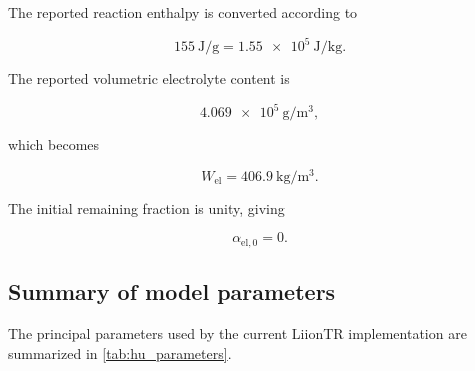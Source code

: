 The reported reaction enthalpy is converted according to

\begin{equation}
    \SI{155}{\joule\per\gram}
    =
    \num{1.55e5}
    \ \si{\joule\per\kilogram}.
\end{equation}

The reported volumetric electrolyte content is

\begin{equation}
    \num{4.069e5}
    \ \si{\gram\per\meter\cubed},
\end{equation}

which becomes

\begin{equation}
    W_{\mathrm{el}}
    =
    \SI{406.9}{\kilogram\per\meter\cubed}.
\end{equation}

The initial remaining fraction is unity, giving

\begin{equation}
    \alpha_{\mathrm{el},0}
    =
    0.
\end{equation}


\subsection{Summary of model parameters}

The principal parameters used by the current LiionTR implementation are
summarized in \cref{tab:hu_parameters}.

